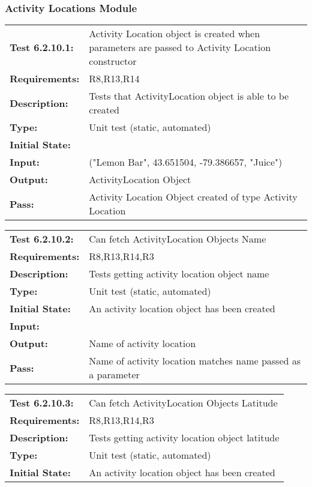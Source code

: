 \documentclass[12pt, titlepage]{article}
\begin{document}
{\subsubsection{Activity Locations Module}
\begin{tabular}{|l|p{10cm}|}
    \hline
    \bf{Test} 6.2.10.1: & Activity Location object is created when parameters are passed to Activity Location constructor\\
    \bf{Requirements}: &  R8,R13,R14\\
    \bf{Description}: & Tests that ActivityLocation object is able to be created\\
    \bf{Type}: & Unit test (static, automated) \\
    \bf{Initial State}: & \\
    \bf{Input}: & ("Lemon Bar", 43.651504, -79.386657, "Juice") \\
    \bf{Output}: & ActivityLocation Object\\
    \bf{Pass}: & Activity Location Object created of type Activity Location \\
    \hline
\end{tabular}
\begin{tabular}{|l|p{10cm}|}
    \hline
    \bf{Test} 6.2.10.2: & Can fetch ActivityLocation Objects Name\\
    \bf{Requirements}: &  R8,R13,R14,R3\\
    \bf{Description}: & Tests getting activity location object name\\
    \bf{Type}: & Unit test (static, automated) \\
    \bf{Initial State}: & An activity location object has been created\\
    \bf{Input}: & \\
    \bf{Output}: & Name of activity location\\
    \bf{Pass}: & Name of activity location matches name passed as a parameter \\
    \hline
\end{tabular}
\begin{tabular}{|l|p{10cm}|}
    \hline
    \bf{Test} 6.2.10.3: & Can fetch ActivityLocation Objects Latitude\\
    \bf{Requirements}: &  R8,R13,R14,R3\\
    \bf{Description}: & Tests getting activity location object latitude\\
    \bf{Type}: & Unit test (static, automated) \\
    \bf{Initial State}: & An activity location object has been created\\

\end{tabular}}
\end{document}
